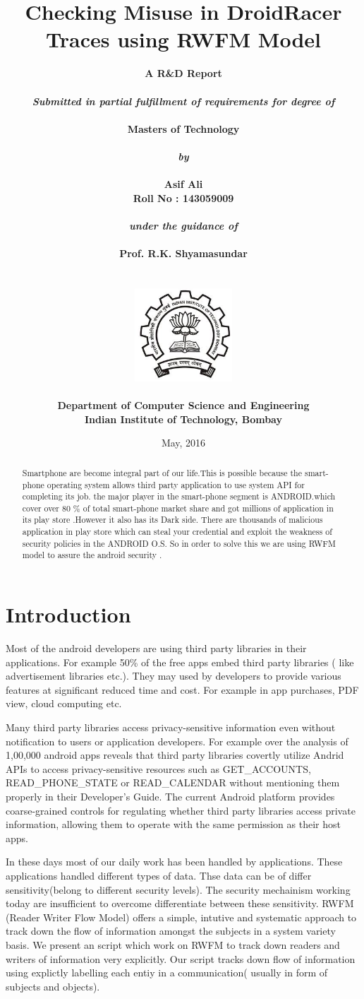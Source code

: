 \documentclass[11pt]{report}
\title{\textbf{Checking Misuse in DroidRacer Traces using RWFM Model}}
\author{\bf{A R\&D Report}\\
        \\
        \emph{Submitted in partial fulfillment of requirements for degree of}\\
        \\
        \bf{Masters of Technology}\\
        \\
        \emph{by}\\
        \\
		\bf{Asif Ali}\\
        \bf{Roll No : 143059009}\\
        \\
        \emph{under the guidance of}\\
        \\
        \bf{Prof. R.K. Shyamasundar}\\
        \\\\
        \includegraphics[height=3.5cm]{./images/iitb_logo}\\
        \\
        \bf{Department of Computer Science and Engineering}\\
        \bf{Indian Institute of Technology, Bombay}\\
}
\date{May, 2016}
\begin{document}
\maketitle
{}
\tableofcontents
\begin{abstract}
 Smartphone are become integral part of our life.This is possible because the smart-phone operating system allows third party application to use system API for completing its job.
the major player in the smart-phone segment is ANDROID.which cover over 80 \% of total smart-phone market share and got millions of application in its play store .However it also has its Dark side.
There are thousands of malicious application in play store which can steal your credential and exploit the weakness of security policies in the ANDROID O.S.
So in order to solve this we are using RWFM model to assure the android security . 
\end{abstract}
\pagebreak

\chapter{Introduction}
Most of the android developers are using third party libraries in their applications. For example 50\% of the free apps embed third party libraries ( like advertisement libraries etc.). 
They may used by developers to provide various features at significant reduced time and cost. For example in app purchases, PDF view, cloud computing etc.
\par Many third party libraries access privacy-sensitive information even without notification to users or application developers. For example over the analysis of 1,00,000 android
apps reveals that third party libraries covertly utilize Andrid APIs to access privacy-sensitive resources such as GET\_ACCOUNTS, READ\_PHONE\_STATE or READ\_CALENDAR without mentioning
them properly in their Developer’s Guide. The current Android platform provides coarse-grained controls for regulating whether third party libraries access private information, allowing
them to operate with the same permission as their host apps.
\par In these days most of our daily work has been handled by applications. These applications handled different types of data. Thse data can be of differ sensitivity(belong to different
security levels). The security mechainism working today are insufficient to overcome differentiate between these sensitivity. RWFM (Reader Writer Flow Model) offers a simple, intutive
and systematic approach to track down the flow of information amongst the subjects in a system variety basis. We present an script which work on RWFM to track down readers and writers of information very explicitly.
Our script tracks down flow of information using explictly labelling each entiy in a communication( usually in form of subjects and objects). 
\end{document}
